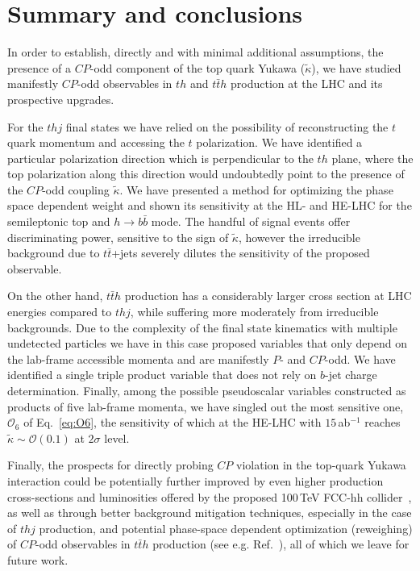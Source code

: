 \documentclass[11pt,a4paper]{article}
\newcommand{\mc}[1]{\mathcal{#1}}
\begin{document}
%
\section{Summary and conclusions}
\label{sec:conclusions}
%
In order to establish, directly and with minimal additional assumptions, the presence of a $CP$-odd component of the top quark Yukawa ($\tilde \kappa$), we have studied manifestly $CP$-odd observables in $th$ and $t\bar t h$ production at the LHC and its prospective upgrades.

For the $t h j$ final states we have relied on the possibility of reconstructing the $t$ quark momentum and accessing the $t$ polarization. We have identified a particular polarization direction which is perpendicular to the $t h$ plane, where the top polarization along this direction would undoubtedly point to the presence of the $CP$-odd coupling $\tilde \kappa$. We have presented a method for optimizing the phase space dependent weight and shown its sensitivity at the HL- and HE-LHC for the semileptonic top and $h \to b\bar b$ mode. The handful of signal events offer discriminating power, sensitive to the sign of $\tilde \kappa$, however the irreducible background due to $t \bar t$+jets severely dilutes the sensitivity of the proposed observable.

On the other hand, $t\bar t h$ production has a considerably larger cross section at LHC energies compared to $t h j$, while suffering more moderately from irreducible backgrounds. Due to the complexity of the final state kinematics with multiple undetected particles we have in this case proposed variables that only depend on the lab-frame accessible momenta and are manifestly $P$- and $CP$-odd. We have identified a single triple product variable that does not rely on $b$-jet charge determination. Finally, among the possible pseudoscalar variables constructed as products of five lab-frame momenta, we have singled out the most sensitive one, $\mc{O}_6$ of Eq.~\eqref{eq:O6}, the sensitivity of which at the HE-LHC with $15$\,ab${}^{-1}$ reaches $\tilde \kappa \sim \mathcal{O}(0.1)$ at $2\sigma$ level. 

Finally, the prospects for directly probing $CP$ violation in the top-quark Yukawa interaction could be potentially further improved by even higher production cross-sections and luminosities offered by the proposed 100\,TeV FCC-hh collider~\cite{Mangano:2016jyj, Contino:2016spe,Benedikt:2018csr}, as well as through better background mitigation techniques, especially in the case of $t h j$ production, and potential phase-space dependent optimization (reweighing) of $CP$-odd observables in $t\bar t h$ production (see e.g. Ref.~\cite{Kraus:2019myc}), all of which we leave for future work.
\end{document}
